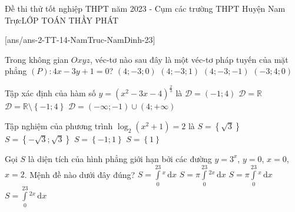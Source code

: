 \begin{name}
	{\tenchude}{Đề thi thử tốt nghiệp THPT năm 2023 - Cụm các trường THPT Huyện Nam Trực}{LỚP TOÁN THẦY PHÁT}{\thoigian}	
\end{name}
\setcounter{ex}{0}\setcounter{bt}{0}
[ans/ans-2-TT-14-NamTruc-NamDinh-23]
\begin{ex}%
	Trong không gian $Oxyz$, véc-tơ nào sau đây là một véc-tơ pháp tuyến của mặt phẳng $(P)\colon 4x-3y+1=0$?
	\choice
	{\True $\left(4;-3;0\right)$}
	{$\left(4;-3;1\right)$}
	{$\left(4;-3;-1\right)$}
	{$\left(-3;4;0\right)$}
\end{ex}
\begin{ex}%
	Tập xác định của hàm số $y=\left(x^2-3x-4\right)^{\tfrac{2}{3}}$ là
	\choice
	{$\mathscr{D}=\left(-1;4\right)$}
	{$\mathscr{D}=\mathbb{R}$}
	{$\mathscr{D}=\mathbb{R}\setminus\left\lbrace -1;4\right\rbrace $}
	{\True $\mathscr{D}=\left(-\infty;-1\right)\cup\left(4;+\infty\right)$}
\end{ex}
\begin{ex}%
	Tập nghiệm của phương trình $\log_2\left(x^2+1\right)=2$ là
	\choice
	{$S=\left\lbrace \sqrt{3}\right\rbrace $}
	{\True $S=\left\lbrace -\sqrt{3};\sqrt{3}\right\rbrace $}
	{$S=\left\lbrace -1;1\right\rbrace $}
	{$S=\left\lbrace 1\right\rbrace $}
\end{ex}
\begin{ex}%
Gọi $S$ là diện tích của hình phẳng giới hạn bởi các đường $y=3^x$, $y=0$, $x=0$, $x=2$. Mệnh đề nào dưới đây đúng?
\choice
{\True $S=\displaystyle\int\limits_0^23^x\mathrm{\,d}x$}
{$S=\pi\displaystyle\int\limits_0^23^{2x}\mathrm{\,d}x$}
{$S=\pi\displaystyle\int\limits_0^23^x\mathrm{\,d}x$}
{$S=\displaystyle\int\limits_0^23^{2x}\mathrm{\,d}x$}
\end{ex}
